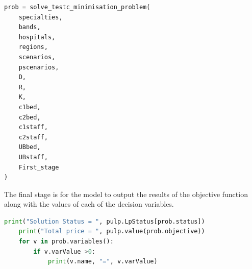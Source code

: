 \documentclass[../thesis.tex]{subfiles}
\begin{document}
\begin{lstlisting}[language=python]
    prob = solve_testc_minimisation_problem(
    specialties,
    bands,
    hospitals,
    regions,
    scenarios,
    pscenarios,
    D,
    R,
    K,
    c1bed,
    c2bed,
    c1staff,
    c2staff,
    UBbed,
    UBstaff,
    First_stage
)
\end{lstlisting}
The final stage is for the model to output the results of the objective function along with the values of each of the decision variables.
\begin{lstlisting}[language=python]
    print("Solution Status = ", pulp.LpStatus[prob.status])
    print("Total price = ", pulp.value(prob.objective))  
    for v in prob.variables():
        if v.varValue >0:
            print(v.name, "=", v.varValue)
\end{lstlisting}
\end{document}
